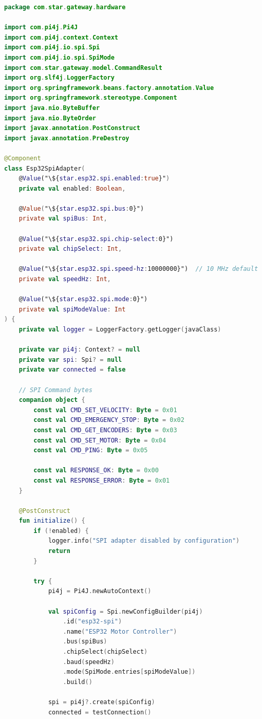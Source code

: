 \begin{lstlisting}[language=Kotlin, caption=Esp32SpiAdapter.kt]
package com.star.gateway.hardware

import com.pi4j.Pi4J
import com.pi4j.context.Context
import com.pi4j.io.spi.Spi
import com.pi4j.io.spi.SpiMode
import com.star.gateway.model.CommandResult
import org.slf4j.LoggerFactory
import org.springframework.beans.factory.annotation.Value
import org.springframework.stereotype.Component
import java.nio.ByteBuffer
import java.nio.ByteOrder
import javax.annotation.PostConstruct
import javax.annotation.PreDestroy

@Component
class Esp32SpiAdapter(
    @Value("\${star.esp32.spi.enabled:true}")
    private val enabled: Boolean,

    @Value("\${star.esp32.spi.bus:0}")
    private val spiBus: Int,

    @Value("\${star.esp32.spi.chip-select:0}")
    private val chipSelect: Int,

    @Value("\${star.esp32.spi.speed-hz:10000000}")  // 10 MHz default
    private val speedHz: Int,

    @Value("\${star.esp32.spi.mode:0}")
    private val spiModeValue: Int
) {
    private val logger = LoggerFactory.getLogger(javaClass)

    private var pi4j: Context? = null
    private var spi: Spi? = null
    private var connected = false

    // SPI Command bytes
    companion object {
        const val CMD_SET_VELOCITY: Byte = 0x01
        const val CMD_EMERGENCY_STOP: Byte = 0x02
        const val CMD_GET_ENCODERS: Byte = 0x03
        const val CMD_SET_MOTOR: Byte = 0x04
        const val CMD_PING: Byte = 0x05

        const val RESPONSE_OK: Byte = 0x00
        const val RESPONSE_ERROR: Byte = 0x01
    }

    @PostConstruct
    fun initialize() {
        if (!enabled) {
            logger.info("SPI adapter disabled by configuration")
            return
        }

        try {
            pi4j = Pi4J.newAutoContext()

            val spiConfig = Spi.newConfigBuilder(pi4j)
                .id("esp32-spi")
                .name("ESP32 Motor Controller")
                .bus(spiBus)
                .chipSelect(chipSelect)
                .baud(speedHz)
                .mode(SpiMode.entries[spiModeValue])
                .build()

            spi = pi4j?.create(spiConfig)
            connected = testConnection()


\end{lstlisting}
